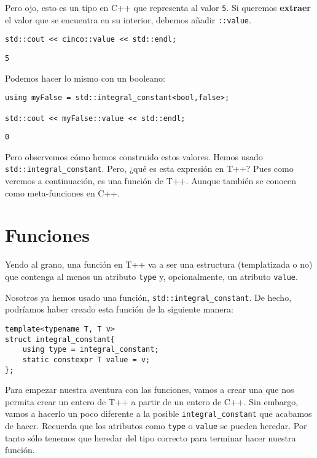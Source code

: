 \documentclass[11pt]{article}
\begin{document}
Pero ojo, esto es un tipo en C++ que representa al valor \texttt{5}. Si queremos \textbf{extraer} el valor que se encuentra en su interior, debemos añadir \texttt{::value}.

\begin{verbatim}
std::cout << cinco::value << std::endl;
\end{verbatim}

\begin{verbatim}
5
\end{verbatim}


Podemos hacer lo mismo con un booleano:

\begin{verbatim}
using myFalse = std::integral_constant<bool,false>;

std::cout << myFalse::value << std::endl;
\end{verbatim}

\begin{verbatim}
0
\end{verbatim}


Pero observemos cómo hemos construido estos valores. Hemos usado \texttt{std::integral\_constant}. Pero, ¿qué es esta expresión en T++? Pues como veremos a continuación, es una función de T++. Aunque también se conocen como meta-funciones en C++.

\section{Funciones}
\label{sec:org773b300}
Yendo al grano, una función en T++ va a ser una estructura (templatizada o no) que contenga al menos un atributo \texttt{type} y, opcionalmente, un atributo \texttt{value}.

Nosotros ya hemos usado una función, \texttt{std::integral\_constant}. De hecho, podríamos haber creado esta función de la siguiente manera:

\begin{verbatim}
template<typename T, T v>
struct integral_constant{
	using type = integral_constant;
	static constexpr T value = v;
};
\end{verbatim}

Para empezar nuestra aventura con las funciones, vamos a crear una que nos permita crear un entero de T++ a partir de un entero de C++. Sin embargo, vamos a hacerlo un poco diferente a la posible \texttt{integral\_constant} que acabamos de hacer. Recuerda que los atributos como \texttt{type} o \texttt{value} se pueden heredar. Por tanto sólo tenemos que heredar del tipo correcto para terminar hacer nuestra función.
\end{document}
